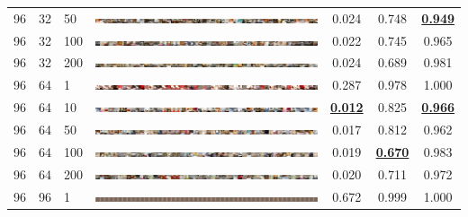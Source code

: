 \documentclass[a4paper]{article}
\begin{document}
\begin{table}[h!]
\begin{center}
{\begin{tabular}{lllcccc}
      96 & 32 & 50  & \includegraphics[width=\textwidth,trim={1536px 0 0 0},clip]{figures/bedrooms_g96_d32_ep50_generator.jpg}   & 0.024 & 0.748 & \underline{\bf 0.949}\\
      96 & 32 & 100 & \includegraphics[width=\textwidth,trim={1536px 0 0 0},clip]{figures/bedrooms_g96_d32_ep100_generator.jpg}  & 0.022 & 0.745 & 0.965\\
      96 & 32 & 200 & \includegraphics[width=\textwidth,trim={1536px 0 0 0},clip]{figures/bedrooms_g96_d32_ep200_generator.jpg}  & 0.024 & 0.689 & 0.981\\
      \hline
      96 & 64 & 1   & \includegraphics[width=\textwidth,trim={1536px 0 0 0},clip]{figures/bedrooms_g96_d64_ep1_generator.jpg}    & 0.287 & 0.978 & 1.000\\
      96 & 64 & 10  & \includegraphics[width=\textwidth,trim={1536px 0 0 0},clip]{figures/bedrooms_g96_d64_ep10_generator.jpg}   & \underline{\bf 0.012} & 0.825 & \underline{\bf 0.966}\\
      96 & 64 & 50  & \includegraphics[width=\textwidth,trim={1536px 0 0 0},clip]{figures/bedrooms_g96_d64_ep50_generator.jpg}   & 0.017 & 0.812 & 0.962\\
      96 & 64 & 100 & \includegraphics[width=\textwidth,trim={1536px 0 0 0},clip]{figures/bedrooms_g96_d64_ep100_generator.jpg}  & 0.019 & \underline{\bf 0.670} & 0.983\\
      96 & 64 & 200 & \includegraphics[width=\textwidth,trim={1536px 0 0 0},clip]{figures/bedrooms_g96_d64_ep200_generator.jpg}  & 0.020 & 0.711 & 0.972\\
      \hline
      96 & 96 & 1   & \includegraphics[width=\textwidth,trim={1536px 0 0 0},clip]{figures/bedrooms_g96_d96_ep1_generator.jpg}    & 0.672 & 0.999 & 1.000\\

\end{tabular}}
\end{center}
\end{table}
\end{document}
